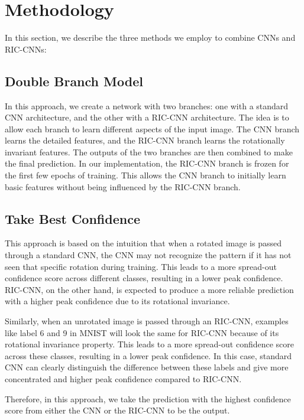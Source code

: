 \section{Methodology}
\label{sec:method}

In this section, we describe the three methods we employ to combine CNNs and RIC-CNNs:
\subsection{Double Branch Model}

In this approach, we create a network with two branches: one with a standard CNN architecture, and the other with a RIC-CNN architecture. The idea is to allow each branch to learn different aspects of the input image. The CNN branch learns the detailed features, and the RIC-CNN branch learns the rotationally invariant features. The outputs of the two branches are then combined to make the final prediction.  In our implementation, the RIC-CNN branch is frozen for the first few epochs of training. This allows the CNN branch to initially learn basic features without being influenced by the RIC-CNN branch.

\subsection{Take Best Confidence}

This approach is based on the intuition that when a rotated image is passed through a standard CNN, the CNN may not recognize the pattern if it has not seen that specific rotation during training. This leads to a more spread-out confidence score across different classes, resulting in a lower peak confidence.  RIC-CNN, on the other hand, is expected to produce a more reliable prediction with a higher peak confidence due to its rotational invariance.

Similarly, when an unrotated image is passed through an RIC-CNN, examples like label 6 and 9 in MNIST will look the same for RIC-CNN because of its rotational invariance property. This leads to a more spread-out confidence score across these classes, resulting in a lower peak confidence. In this case, standard CNN can clearly distinguish the difference between these labels and give more concentrated and higher peak confidence compared to RIC-CNN.

Therefore, in this approach, we take the prediction with the highest confidence score from either the CNN or the RIC-CNN to be the output.

